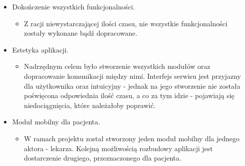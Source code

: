 

\begin{itemize}
	\item Dokończenie wszystkich funkcjonalności.
	\begin{itemize}
		\item Z racji niewystarczającej ilości czasu, nie wszystkie funkcjonalności zostały wykonane bądź dopracowane. 
	\end{itemize}
	
	\item Estetyka aplikacji.
	\begin{itemize}
		\item Nadrzędnym celem było stworzenie wszystkich modułów oraz dopracowanie komunikacji między nimi. Interfejs serwisu jest przyjazny dla użytkownika oraz intuicyjny - jednak na jego stworzenie nie została poświęcona odpowiednia ilość czasu, a co za tym idzie - pojawiają się niedociągnięcia, które należałoby poprawić.
	\end{itemize}
	
		\item Moduł mobilny dla pacjenta.
	\begin{itemize}
		\item W ramach projektu został stworzony jeden moduł mobilny dla jednego aktora - lekarza. Kolejną możliwością rozbudowy aplikacji jest dostarczenie drugiego, przeznaczonego dla pacjenta.
	\end{itemize}

\end{itemize}